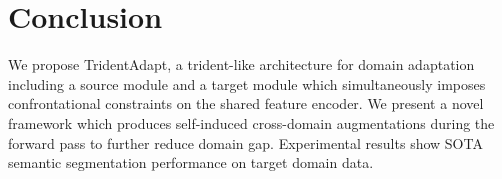 \documentclass{bmvc2k}
\begin{document}
\section{Conclusion}


We propose TridentAdapt, a trident-like architecture for domain adaptation including a source module and a target module which simultaneously imposes confrontational constraints on the shared feature encoder. We present a novel framework which produces self-induced cross-domain augmentations during the forward pass to further reduce domain gap. Experimental results show SOTA semantic segmentation performance on target domain data. 


\end{document}
